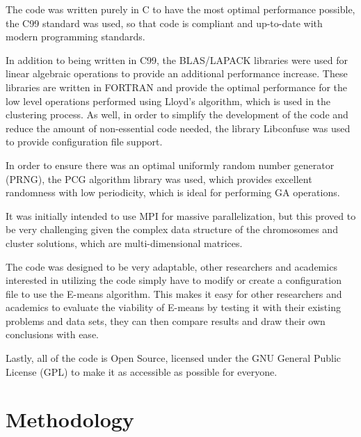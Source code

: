 \documentclass{article}
\begin{document}
The code was written purely in C to have the most optimal performance possible, the C99 standard\cite{c99} was used, so that code is compliant and up-to-date with modern programming standards.

In addition to being written in C99, the BLAS/LAPACK libraries were used for linear algebraic operations to provide an additional performance increase. These libraries are written in FORTRAN and provide the optimal performance for the low level operations performed using Lloyd's algorithm, which is used in the clustering process. As well, in order to simplify the development of the code and reduce the amount of non-essential code needed, the library Libconfuse was used to provide configuration file support.

In order to ensure there was an optimal uniformly random number generator (PRNG), the PCG algorithm library was used, which provides excellent randomness with low periodicity, which is ideal for performing GA operations.

It was initially intended to use MPI for massive parallelization, but this proved to be very challenging given the complex data structure of the chromosomes and cluster solutions, which are multi-dimensional matrices.

The code was designed to be very adaptable, other researchers and academics interested in utilizing the code simply have to modify or create a configuration file to use the E-means algorithm. This makes it easy for other researchers and academics to evaluate the viability of E-means by testing it with their existing problems and data sets, they can then compare results and draw their own conclusions with ease.

Lastly, all of the code is Open Source, licensed under the GNU General Public License (GPL) to make it as accessible as possible for everyone.




\section{Methodology}
\end{document}
